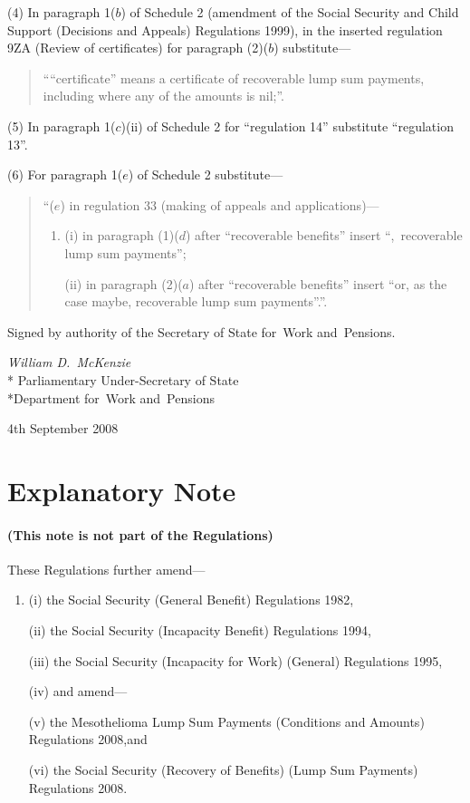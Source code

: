 \documentclass[12pt,a4paper]{article}
\begin{document}
(4) In paragraph 1($b$)  of Schedule 2 (amendment of the Social Security and Child Support (Decisions and Appeals) Regulations 1999), in the inserted regulation 9ZA (Review of certificates) for paragraph (2)($b$)  substitute—
\begin{quotation}
““certificate” means a certificate of recoverable lump sum payments, including where any of the amounts is nil;”.
\end{quotation}

(5) In paragraph 1($c$)(ii)  of Schedule 2 for “regulation 14” substitute “regulation 13”.

(6) For paragraph 1($e$)  of Schedule 2 substitute—
\begin{quotation}
“($e$) in regulation 33 (making of appeals and applications)—
\begin{enumerate}\item[]
(i) in paragraph (1)($d$)  after “recoverable benefits” insert “,~recoverable lump sum payments”;

(ii) in paragraph (2)($a$)  after “recoverable benefits” insert “or, as the case maybe, recoverable lump sum payments”.”.
\end{enumerate}
\end{quotation}

\bigskip

\pagebreak[3]

Signed 
by authority of the 
Secretary of State for~Work and~Pensions.

{\raggedleft
\emph{William D.\ McKenzie}\\*
Parliamentary Under-Secretary 
of State\\*Department 
for~Work and~Pensions

}

4th September 2008

\small

\part{Explanatory Note}

\renewcommand\parthead{— Explanatory Note}

\subsection*{(This note is not part of the Regulations)}

These Regulations further amend—
\begin{enumerate}\item[]
(i) the Social Security (General Benefit) Regulations 1982,

(ii) the Social Security (Incapacity Benefit) Regulations 1994,

(iii) the Social Security (Incapacity for Work) (General) Regulations 1995,

(iv) and amend—

(v) the Mesothelioma Lump Sum Payments (Conditions and Amounts) Regulations 2008,and

(vi) the Social Security (Recovery of Benefits) (Lump Sum Payments) Regulations 2008.
\end{enumerate}
\end{document}
